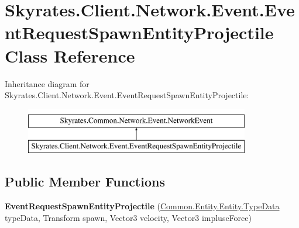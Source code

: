 \hypertarget{class_skyrates_1_1_client_1_1_network_1_1_event_1_1_event_request_spawn_entity_projectile}{\section{Skyrates.\-Client.\-Network.\-Event.\-Event\-Request\-Spawn\-Entity\-Projectile Class Reference}
\label{class_skyrates_1_1_client_1_1_network_1_1_event_1_1_event_request_spawn_entity_projectile}
}
Inheritance diagram for Skyrates.\-Client.\-Network.\-Event.\-Event\-Request\-Spawn\-Entity\-Projectile\-:\begin{figure}[H]
\begin{center}
\leavevmode
\includegraphics[height=2.000000cm]{class_skyrates_1_1_client_1_1_network_1_1_event_1_1_event_request_spawn_entity_projectile}
\end{center}
\end{figure}
\subsection*{Public Member Functions}
\begin{DoxyCompactItemize}
\item 
\hypertarget{class_skyrates_1_1_client_1_1_network_1_1_event_1_1_event_request_spawn_entity_projectile_a2768cd31f2a853622f13683aeabfc631}{{\bfseries Event\-Request\-Spawn\-Entity\-Projectile} (\hyperlink{class_skyrates_1_1_common_1_1_entity_1_1_entity_1_1_type_data}{Common.\-Entity.\-Entity.\-Type\-Data} type\-Data, Transform spawn, Vector3 velocity, Vector3 impluse\-Force)}\label{class_skyrates_1_1_client_1_1_network_1_1_event_1_1_event_request_spawn_entity_projectile_a2768cd31f2a853622f13683aeabfc631}

\end{DoxyCompactItemize}
